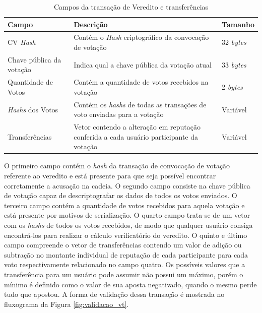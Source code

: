\begin{table}[ht]
\centering
    \begin{tabular}{|m{}|m{}|m{}|}
    \hline
         \textbf{Campo} & \textbf{Descrição} & \textbf{Tamanho}  \\
         \hline
         \ac{CV} \textit{Hash} & Contém o \textit{Hash} criptográfico da convocação de votação & 32 \textit{bytes} \\
         \hline
         Chave pública da votação & Indica qual a chave pública da votação atual & 33 \textit{bytes} \\
         \hline
         Quantidade de Votos & Contém a quantidade de votos recebidos na votação & 2 \textit{bytes}\\
         \hline
         \textit{Hashs} dos Votos & Contém os \textit{hashs} de todas as transações de voto enviadas para a votação & Variável\\
         \hline
         Transferências & Vetor contendo a alteração em reputação conferida a cada usuário participante da votação & Variável \\
    \hline
    \end{tabular}
    \caption{Campos da transação de Veredito e transferências}
    \label{tabela:vt}
\end{table}

O primeiro campo contém o \textit{hash} da transação de convocação de votação referente ao veredito e está presente para que seja possível encontrar corretamente a acusação na cadeia. O segundo campo consiste na chave pública de votação capaz de descriptografar os dados de todos os votos enviados. O terceiro campo contém a quantidade de votos recebidos para aquela votação e está presente por motivos de serialização. O quarto campo trata-se de um vetor com os \textit{hashs} de todos os votos recebidos, de modo que qualquer usuário consiga encontrá-los para realizar o cálculo verificatório do veredito. O quinto e último campo compreende o vetor de transferências contendo um valor de adição ou subtração no montante individual de reputação de cada participante para cada voto respectivamente relacionado no campo quatro. Os possíveis valores que a transferência para um usuário pode assumir não possui um máximo, porém o mínimo é definido como o valor de sua aposta negativado, quando o mesmo perde tudo que apostou. A forma de validação dessa transação é mostrada no fluxograma da Figura \ref{fig:validacao_vt}.

